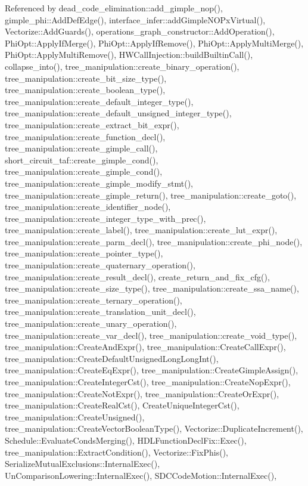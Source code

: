 Referenced by dead\+\_\+code\+\_\+elimination\+::add\+\_\+gimple\+\_\+nop(), gimple\+\_\+phi\+::\+Add\+Def\+Edge(), interface\+\_\+infer\+::add\+Gimple\+N\+O\+Px\+Virtual(), Vectorize\+::\+Add\+Guards(), operations\+\_\+graph\+\_\+constructor\+::\+Add\+Operation(), Phi\+Opt\+::\+Apply\+If\+Merge(), Phi\+Opt\+::\+Apply\+If\+Remove(), Phi\+Opt\+::\+Apply\+Multi\+Merge(), Phi\+Opt\+::\+Apply\+Multi\+Remove(), H\+W\+Call\+Injection\+::build\+Builtin\+Call(), collapse\+\_\+into(), tree\+\_\+manipulation\+::create\+\_\+binary\+\_\+operation(), tree\+\_\+manipulation\+::create\+\_\+bit\+\_\+size\+\_\+type(), tree\+\_\+manipulation\+::create\+\_\+boolean\+\_\+type(), tree\+\_\+manipulation\+::create\+\_\+default\+\_\+integer\+\_\+type(), tree\+\_\+manipulation\+::create\+\_\+default\+\_\+unsigned\+\_\+integer\+\_\+type(), tree\+\_\+manipulation\+::create\+\_\+extract\+\_\+bit\+\_\+expr(), tree\+\_\+manipulation\+::create\+\_\+function\+\_\+decl(), tree\+\_\+manipulation\+::create\+\_\+gimple\+\_\+call(), short\+\_\+circuit\+\_\+taf\+::create\+\_\+gimple\+\_\+cond(), tree\+\_\+manipulation\+::create\+\_\+gimple\+\_\+cond(), tree\+\_\+manipulation\+::create\+\_\+gimple\+\_\+modify\+\_\+stmt(), tree\+\_\+manipulation\+::create\+\_\+gimple\+\_\+return(), tree\+\_\+manipulation\+::create\+\_\+goto(), tree\+\_\+manipulation\+::create\+\_\+identifier\+\_\+node(), tree\+\_\+manipulation\+::create\+\_\+integer\+\_\+type\+\_\+with\+\_\+prec(), tree\+\_\+manipulation\+::create\+\_\+label(), tree\+\_\+manipulation\+::create\+\_\+lut\+\_\+expr(), tree\+\_\+manipulation\+::create\+\_\+parm\+\_\+decl(), tree\+\_\+manipulation\+::create\+\_\+phi\+\_\+node(), tree\+\_\+manipulation\+::create\+\_\+pointer\+\_\+type(), tree\+\_\+manipulation\+::create\+\_\+quaternary\+\_\+operation(), tree\+\_\+manipulation\+::create\+\_\+result\+\_\+decl(), create\+\_\+return\+\_\+and\+\_\+fix\+\_\+cfg(), tree\+\_\+manipulation\+::create\+\_\+size\+\_\+type(), tree\+\_\+manipulation\+::create\+\_\+ssa\+\_\+name(), tree\+\_\+manipulation\+::create\+\_\+ternary\+\_\+operation(), tree\+\_\+manipulation\+::create\+\_\+translation\+\_\+unit\+\_\+decl(), tree\+\_\+manipulation\+::create\+\_\+unary\+\_\+operation(), tree\+\_\+manipulation\+::create\+\_\+var\+\_\+decl(), tree\+\_\+manipulation\+::create\+\_\+void\+\_\+type(), tree\+\_\+manipulation\+::\+Create\+And\+Expr(), tree\+\_\+manipulation\+::\+Create\+Call\+Expr(), tree\+\_\+manipulation\+::\+Create\+Default\+Unsigned\+Long\+Long\+Int(), tree\+\_\+manipulation\+::\+Create\+Eq\+Expr(), tree\+\_\+manipulation\+::\+Create\+Gimple\+Assign(), tree\+\_\+manipulation\+::\+Create\+Integer\+Cst(), tree\+\_\+manipulation\+::\+Create\+Nop\+Expr(), tree\+\_\+manipulation\+::\+Create\+Not\+Expr(), tree\+\_\+manipulation\+::\+Create\+Or\+Expr(), tree\+\_\+manipulation\+::\+Create\+Real\+Cst(), Create\+Unique\+Integer\+Cst(), tree\+\_\+manipulation\+::\+Create\+Unsigned(), tree\+\_\+manipulation\+::\+Create\+Vector\+Boolean\+Type(), Vectorize\+::\+Duplicate\+Increment(), Schedule\+::\+Evaluate\+Conds\+Merging(), H\+D\+L\+Function\+Decl\+Fix\+::\+Exec(), tree\+\_\+manipulation\+::\+Extract\+Condition(), Vectorize\+::\+Fix\+Phis(), Serialize\+Mutual\+Exclusions\+::\+Internal\+Exec(), Un\+Comparison\+Lowering\+::\+Internal\+Exec(), S\+D\+C\+Code\+Motion\+::\+Internal\+Exec(), 